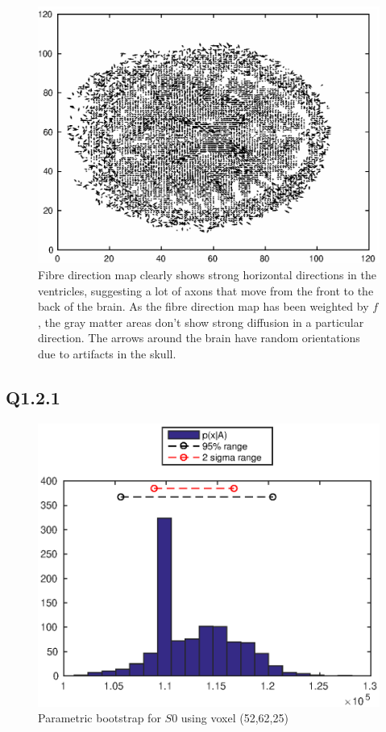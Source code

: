 \documentclass[11pt,a4paper,oneside]{report}
\begin{document}
\begin{figure}[H]
      \centering
    \includegraphics[scale=1]{figures/q1/q114-fbDir.eps}
    \caption{Fibre direction map clearly shows strong horizontal directions in the ventricles, suggesting a lot of axons that move from the front to the back of the brain. As the fibre direction map has been weighted by $f$, the gray matter areas don't show strong diffusion in a particular direction. The arrows around the brain have random orientations due to artifacts in the skull.}
    \label{q114-fbDir}
\end{figure}

\subsection*{Q1.2.1}

\begin{figure}[H]
      \centering
    \includegraphics[scale=1]{figures/q2/q121-p1.eps}
    \caption{Parametric bootstrap for $S0$ using voxel (52,62,25)}
    \label{q121-p1}
\end{figure}
\end{document}
